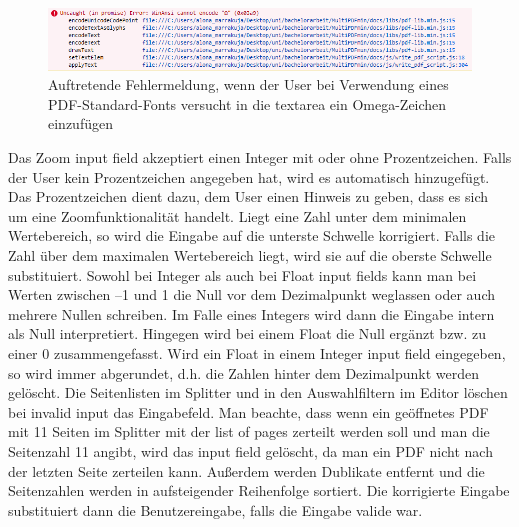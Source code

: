 \begin{figure}[!htbp]
	\centering
	\includegraphics[width=1\textwidth]{"images/font-error.png"}
	\caption{Auftretende Fehlermeldung, wenn der User bei Verwendung eines PDF-Standard-Fonts versucht in die textarea ein Omega-Zeichen einzufügen}
	\label{fig:font-error}
\end{figure}

Das Zoom input field akzeptiert einen Integer mit oder ohne Prozentzeichen. Falls der User kein Prozentzeichen angegeben hat, wird es automatisch hinzugefügt. Das Prozentzeichen dient dazu, dem User einen Hinweis zu geben, dass es sich um eine Zoomfunktionalität handelt. Liegt eine Zahl unter dem minimalen Wertebereich, so wird die Eingabe auf die unterste Schwelle korrigiert. Falls die Zahl über dem maximalen Wertebereich liegt, wird sie auf die oberste Schwelle substituiert. Sowohl bei Integer als auch bei Float input fields kann man bei Werten zwischen –1 und 1 die Null vor dem Dezimalpunkt weglassen oder auch mehrere Nullen schreiben. Im Falle eines Integers wird dann die Eingabe intern als Null interpretiert. Hingegen wird bei einem Float die Null ergänzt bzw. zu einer 0 zusammengefasst. Wird ein Float in einem Integer input field eingegeben, so wird immer abgerundet, d.h. die Zahlen hinter dem Dezimalpunkt werden gelöscht. Die Seitenlisten im Splitter und in den Auswahlfiltern im Editor löschen bei invalid input das Eingabefeld. Man beachte, dass wenn ein geöffnetes PDF mit 11 Seiten im Splitter mit der list of pages zerteilt werden soll und man die Seitenzahl 11 angibt, wird das input field gelöscht, da man ein PDF nicht nach der letzten Seite zerteilen kann. Außerdem werden Dublikate entfernt und die Seitenzahlen werden in aufsteigender Reihenfolge sortiert. Die korrigierte Eingabe substituiert dann die Benutzereingabe, falls die Eingabe valide war. 

